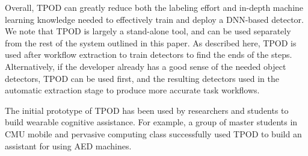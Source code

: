 Overall, TPOD can greatly reduce both the labeling effort and in-depth machine
learning knowledge needed to effectively train and deploy a DNN-based detector.
We note that TPOD is largely a stand-alone tool, and can be used separately from
the rest of the system outlined in this paper.  As described here, TPOD is used
after workflow extraction to train detectors to find the ends of the steps.
Alternatively, if the developer already has a good sense of the needed object
detectors, TPOD can be used first, and the resulting detectors used in the
automatic extraction stage to produce more accurate task workflows.


The initial prototype of TPOD has been used by researchers and students to build
wearable cognitive assistance. For example, a group of master students in CMU
mobile and pervasive computing class successfully used TPOD to build an
assistant for using AED machines.
